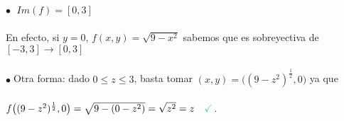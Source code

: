 \documentclass{article}
\theoremstyle{definition}
\theoremstyle{remark}
\newcommand\bl{$\bullet\;$}
\newcommand\ok{\checkmark}
\begin{document}
\begin{figure}[h]
\centering
\def\svgwidth{1\textwidth}

\end{figure}
\; 
\textcolor{rojop2}{\bl} $Im(f)=[0,3]$ \\\\ En efecto, si $y=0$, $f(x,y) = \sqrt{9-x^2}$ sabemos que es sobreyectiva de \mbox{$[-3,3] \to [0,3]$} \\\\ \bl Otra forma: dado $0 \leq z \leq 3$, basta tomar $(x,y)=\big((9-z^2)^{\frac{1}{2}},0\big)$ ya que  \\ \\ $f\big((9-z^2)^\frac{1}{2},0\big)=\sqrt{9-(0-z^2)}=\sqrt{z^2}=z \quad \textcolor{verdep2}{\ok}$.


\begin{figure}[h]
\centering
\def\svgwidth{1\textwidth}

\end{figure} \; 
\pagebreak \\
\end{document}
